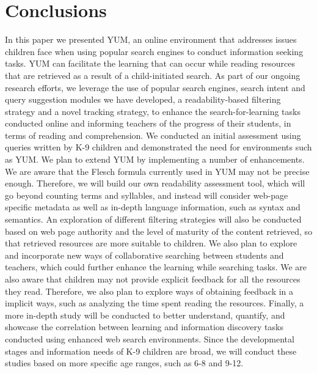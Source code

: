 \documentclass{sig-alternate-05-2015}
\begin{document}
\section{Conclusions}


In this paper we presented YUM, an online environment that addresses issues children face when using popular search engines to conduct information seeking tasks. YUM can facilitate the learning that can occur while reading resources that are retrieved as a result of a child-initiated search. As part of our ongoing research efforts, we leverage the use of popular search engines, search intent and query suggestion modules we have developed, a readability-based filtering strategy and a novel tracking strategy, to enhance the search-for-learning tasks conducted online and informing teachers of the progress of their students, in terms of reading and comprehension. We conducted an initial assessment using queries written by K-9 children and demonstrated the need for environments such as YUM. 
We plan to extend YUM by implementing a number of enhancements. We are aware that the Flesch formula currently used in YUM may not be precise enough. Therefore, we will build our own readability assessment tool, which will go beyond counting terms and syllables, and instead will consider web-page specific metadata as well as in-depth language information, such as syntax and semantics.  An exploration of different filtering strategies will also be conducted  based on web page authority and the level of maturity of the content retrieved, so that retrieved resources are more suitable to children. We also plan to explore and incorporate new ways of collaborative searching between students and teachers, which could further enhance the learning while searching tasks. We are also aware that children may not provide explicit feedback for all the resources they read. Therefore, we also plan to explore ways of obtaining feedback in a implicit ways, such as analyzing the time spent reading the resources. Finally, a more in-depth study will be conducted to better understand, quantify, and showcase the correlation between learning and information discovery tasks conducted using enhanced web search environments.  Since the developmental stages and information needs of K-9 children are broad, we will conduct these studies based on more specific age ranges, such as 6-8 and 9-12. \\\\
\end{document}

